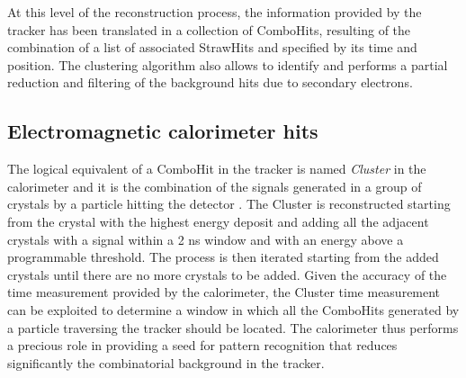 \documentclass[12pt,a4paper,openright, oneside, titlepage]{book} %
\begin{document}
At this level of the reconstruction process, the information provided by the tracker has been translated in a collection of ComboHits, resulting of the combination of a list of associated StrawHits and specified by its time and position.
The clustering algorithm also allows to identify and  performs a partial reduction and filtering of the background hits due to secondary electrons.

\subsection{Electromagnetic calorimeter hits} 
The logical equivalent of a ComboHit in the tracker is named \textit{Cluster} in the calorimeter and it is the combination of the signals generated in a group of crystals by a particle hitting the detector \cite{CalCluster_2} \cite{CalCluster}. 
The Cluster is reconstructed starting from the crystal with the highest energy deposit and adding all the adjacent crystals with a signal within a 2 ns window and with an energy above a programmable threshold. 
The process is then iterated starting from the added crystals until there are no more crystals to be added.
Given the accuracy of the time measurement provided by the calorimeter, the Cluster time measurement can be exploited to determine a window in which all the ComboHits generated by a particle traversing the tracker should be located.
The calorimeter thus performs a precious role in providing a seed for pattern recognition that reduces significantly the combinatorial background in the tracker.
\end{document}
